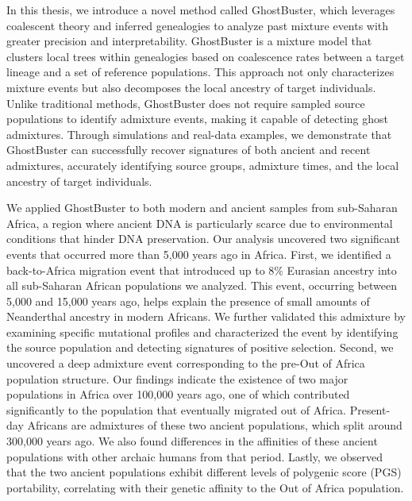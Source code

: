 In this thesis, we introduce a novel method called GhostBuster, which leverages coalescent theory and inferred genealogies to analyze past mixture events with greater precision and interpretability. GhostBuster is a mixture model that clusters local trees within genealogies based on coalescence rates between a target lineage and a set of reference populations. This approach not only characterizes mixture events but also decomposes the local ancestry of target individuals. Unlike traditional methods, GhostBuster does not require sampled source populations to identify admixture events, making it capable of detecting ghost admixtures. Through simulations and real-data examples, we demonstrate that GhostBuster can successfully recover signatures of both ancient and recent admixtures, accurately identifying source groups, admixture times, and the local ancestry of target individuals.

We applied GhostBuster to both modern and ancient samples from sub-Saharan Africa, a region where ancient DNA is particularly scarce due to environmental conditions that hinder DNA preservation. Our analysis uncovered two significant events that occurred more than 5,000 years ago in Africa. First, we identified a back-to-Africa migration event that introduced up to 8\% Eurasian ancestry into all sub-Saharan African populations we analyzed. This event, occurring between 5,000 and 15,000 years ago, helps explain the presence of small amounts of Neanderthal ancestry in modern Africans. We further validated this admixture by examining specific mutational profiles and characterized the event by identifying the source population and detecting signatures of positive selection. Second, we uncovered a deep admixture event corresponding to the pre-Out of Africa population structure. Our findings indicate the existence of two major populations in Africa over 100,000 years ago, one of which contributed significantly to the population that eventually migrated out of Africa. Present-day Africans are admixtures of these two ancient populations, which split around 300,000 years ago. We also found differences in the affinities of these ancient populations with other archaic humans from that period. Lastly, we observed that the two ancient populations exhibit different levels of polygenic score (PGS) portability, correlating with their genetic affinity to the Out of Africa population.









